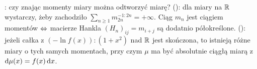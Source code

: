 : czy znając momenty miary można odtworzyć miarę?
 (): dla miary na $\mathbb{R}$ wystarczy, żeby zachodziło $\sum_{n \ge 1} m_{2n}^{-1:2n} = +\infty$.
Ciąg $m_n$ jest ciągiem momentów $\Leftrightarrow$ macierze Hankla $(H_n)_{ij} = m_{i+j}$ są dodatnio półokreślone.
 (): jeżeli całka z $(- \ln f(x)) : (1 + x^2)$ nad $\mathbb{R}$ jest skończona, to istnieją różne miary o tych samych momentach, przy czym $\mu$ ma być absolutnie ciągłą miarą z $\textrm{d} \mu(x) = f(x) \,\textrm{d} x$.